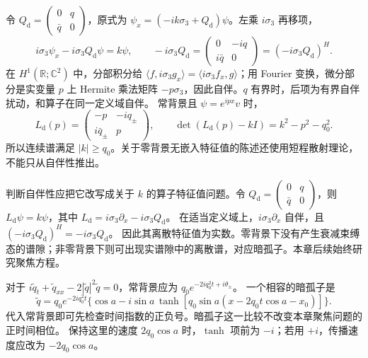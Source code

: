\documentclass[lang=cn,scheme=chinese,mode=simple,device=normal,color=blue,
math=cm,thmcnt=section,12pt]{elegantbook}
\begin{document}
\begin{callout}
    令 $Q_{\mathrm{d}}=\begin{pmatrix}0&q\\\bar q&0\end{pmatrix}$，原式为 $\psi_x=(-ik\sigma_3+Q_{\mathrm{d}})\psi$。左乘 $i\sigma_3$ 再移项，
    \[
        i\sigma_3\psi_x-i\sigma_3Q_{\mathrm{d}}\psi=k\psi,\qquad
        -i\sigma_3Q_{\mathrm{d}}=\begin{pmatrix}0&-iq\\i\bar q&0\end{pmatrix}
        =(-i\sigma_3Q_{\mathrm{d}})^H.
    \]
    在 $H^1(\mathbb R;\mathbb C^2)$ 中，分部积分给
    $\langle f,i\sigma_3g_x\rangle=\langle i\sigma_3f_x,g\rangle$；用 Fourier 变换，微分部分是实变量 $p$ 上 Hermite 乘法矩阵 $-p\sigma_3$，因此自伴。$q$ 有界时，后项为有界自伴扰动，和算子在同一定义域自伴。
    常背景且 $\psi=e^{ipx}v$ 时，
    \[
        L_{\mathrm{d}}(p)=\begin{pmatrix}-p&-iq_\pm\\i\bar q_\pm&p\end{pmatrix},\qquad
        \det(L_{\mathrm{d}}(p)-kI)=k^2-p^2-q_0^2.
    \]
    所以连续谱满足 $|k|\ge q_0$。关于零背景无嵌入特征值的陈述还使用短程散射理论，不能只从自伴性推出。
\end{callout}

判断自伴性应把它改写成关于 $k$ 的算子特征值问题。令 $Q_{\mathrm{d}}=\begin{pmatrix}0&q\\\bar q&0\end{pmatrix}$，则
$L_{\mathrm{d}}\psi=k\psi$，其中 $L_{\mathrm{d}}=i\sigma_3\partial_x-i\sigma_3Q_{\mathrm{d}}$。
在适当定义域上，$i\sigma_3\partial_x$ 自伴，且 $(-i\sigma_3Q_{\mathrm{d}})^H=-i\sigma_3Q_{\mathrm{d}}$。
因此其离散特征值为实数。零背景下没有产生衰减束缚态的谱隙；非零背景下则可出现实谱隙中的离散谱，对应暗孤子。本章后续始终研究聚焦方程。

\begin{callout}[补充：散焦暗孤子的正确时间相位]
    对于 $i\widetilde q_t+\widetilde q_{xx}-2|\widetilde q|^2\widetilde q=0$，常背景应为 $q_0e^{-2iq_0^2t+i\theta_\pm}$。
    一个相容的暗孤子是
    \[
        \widetilde q=q_0e^{-2iq_0^2t}
        \{\cos a-i\sin a\,\tanh[q_0\sin a(x-2q_0t\cos a-x_0)]\}.
    \]
    代入常背景即可先检查时间指数的正负号。暗孤子这一比较不改变本章聚焦问题的正时间相位。
    保持这里的速度 $2q_0\cos a$ 时，$\tanh$ 项前为 $-i$；若用 $+i$，传播速度应改为 $-2q_0\cos a$。
\end{callout}
\end{document}
